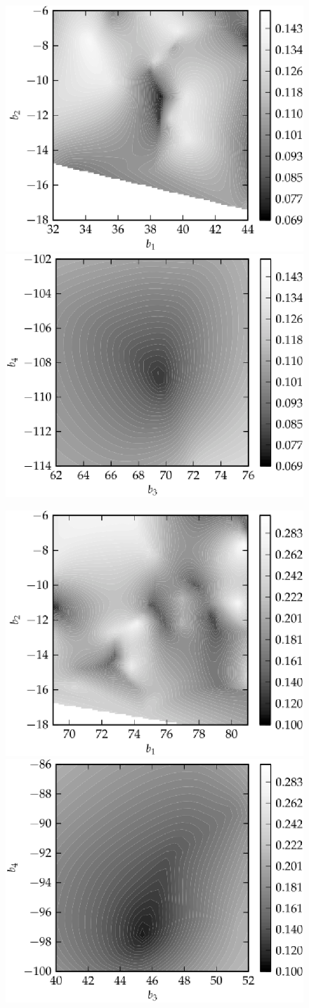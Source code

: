\begin{figure}%
\centerline{
\includegraphics[height=0.5\textwidth,  clip]{figures/imrimri/b1b2_mapb1b2m1m6no.eps}
\includegraphics[height=0.5\textwidth,  clip]{figures/imrimri/b3b4_mapb3b4m1m6no.eps}
}
\centerline{
\includegraphics[height=0.5\textwidth,  clip]{figures/imrimri/b1b2_mapb1b2m1m8no.eps}
\includegraphics[height=0.5\textwidth,  clip]{figures/imrimri/b3b4_mapb3b4m1m8no.eps}
}
\end{figure}
